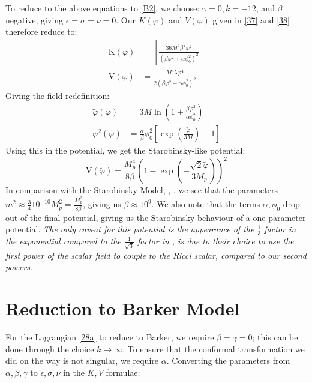 \documentclass[aps,prd,reprint,preprintnumbers,showpacs,floatfix,nofootinbib,superscript address]{revtex4-2}
\begin{document}
To reduce to the above equations to \ref{B2}, we choose: $\gamma = 0, k = -12$, and $\beta$ negative, giving $\epsilon = \sigma = \nu = 0$. Our $K(\varphi)$ and $V(\varphi)$ given in \ref{37} and \ref{38} therefore reduce to:
\begin{align}
    \text{K}(\varphi) &= \left[\frac{36 M^2 \beta^2 \varphi^2}{ (\beta \varphi^2 + \alpha \phi_0^2)^2}\right] \\
    \text{V}(\varphi) &= \frac{ M^4 \lambda \varphi^4}{2(\beta \varphi^2 + \alpha \phi_0^2)^2}    
\end{align}
Giving the field redefinition:
\begin{align}
    \tilde{\varphi}(\varphi) &= 3M \ln\left(1 + \frac{\beta \varphi^2}{\alpha \phi_0^2} \right) \nonumber \\
    \varphi^2(\tilde{\varphi}) &=  \frac{\alpha}{\beta} \phi_0^2\left [ \exp\left(\frac{\tilde{\varphi}}{3M}\right) -1\right]
\end{align}
Using this in the potential, we get the Starobinsky-like potential:
\begin{equation}
    \text{V}(\tilde{\varphi}) = \frac{ M_p^4}{8 \beta}  \left(1 - \exp\left(-\frac{\sqrt{2} \tilde{\varphi}}{3 M_p}\right)\right)^2
\end{equation}
In comparison with the Starobinsky Model, \cite{ivanov2022analytic}, \cite{lust2024starobinsky}, we see that the parameters $m^2 \approx \frac{3}{4} 10^{-10}M_p^2 =\frac{M_p^2}{8\beta}$, giving us $\beta \approx 10^{9}$. We also note that the terms $\alpha, \phi_0$ drop out of the final potential, giving us the Starobinsky behaviour of a one-parameter potential. \textit{The only caveat for this potential is the appearance of the $\frac{1}{3}$ factor in the exponential compared to the $\frac{1}{\sqrt{3}}$ factor in \cite{lust2024starobinsky}, is due to their choice to use the first power of the scalar field to couple to the Ricci scalar, compared to our second powers}.

\section{Reduction to Barker Model}
For the Lagrangian \ref{28a} to reduce to Barker, we require $\beta = \gamma =0$; this can be done through the choice $k \rightarrow\infty$. To ensure that the conformal transformation we did on the way is not singular, we require $\alpha$. Converting the parameters from $\alpha, \beta, \gamma$ to $\epsilon, \sigma, \nu$ in the $K,V$ formulae:
\end{document}
